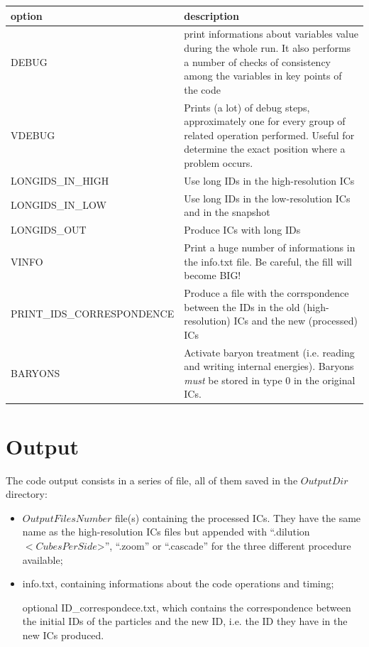 \documentclass[11pt,a4paper,titlepage]{article}
\newcommand{\virg}[1]{``{#1}''}
\begin{document}
\begin{longtable}{l|p{6cm}}
\textbf{option}                    &  \textbf{description} \\
\hline
DEBUG                              &  print informations about variables value during the whole run. It also performs a number of checks of consistency among the variables in key points of the code \\
VDEBUG                             &  Prints (a lot) of debug steps, approximately one for every group of related operation performed. Useful for determine the exact position where a problem occurs. \\
LONGIDS\_IN\_HIGH                  &  Use long IDs in the high-resolution ICs \\
LONGIDS\_IN\_LOW                   &  Use long IDs in the low-resolution ICs and in the snapshot \\
LONGIDS\_OUT                       &  Produce ICs with long IDs \\
VINFO                              &  Print a huge number of informations in the info.txt file. Be careful, the fill will become BIG! \\
PRINT\_IDS\_CORRESPONDENCE         &  Produce a file with the corrspondence between the IDs in the old (high-resolution) ICs and the new (processed) ICs \\
BARYONS                            &  Activate baryon treatment (i.e. reading and writing internal energies). Baryons \emph{must} be stored in type 0 in the original ICs. \\
\hline
\end{longtable}

\section{Output}
The code output consists in a series of file, all of them saved in the $OutputDir$ directory:
\begin{itemize}
\item $OutputFilesNumber$ file(s) containing the processed ICs. They have the same name as the high-resolution ICs files but appended with \virg{.dilution$<CubesPerSide$>}, \virg{.zoom} or \virg{.cascade} for the three different procedure available;
\item info.txt, containing informations about the code operations and timing;
\item [optional] ID\_correspondece.txt, which contains the correspondence between the initial IDs of the particles and the new ID, i.e. the ID they have in the new ICs produced.
\end{itemize}
\end{document}
